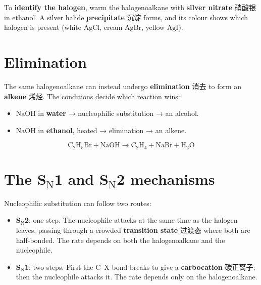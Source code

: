 \documentclass[11pt]{article}
\begin{document}
\begin{center}
\end{center}

To \textbf{identify the halogen}, warm the halogenoalkane with \textbf{silver nitrate} 硝酸银 in ethanol. A silver halide \textbf{precipitate} 沉淀 forms, and its colour shows which halogen is present (white $\text{AgCl}$, cream $\text{AgBr}$, yellow $\text{AgI}$).

\section*{Elimination}

The same halogenoalkane can instead undergo \textbf{elimination} 消去 to form an \textbf{alkene} 烯烃. The conditions decide which reaction wins:

\begin{itemize}
\item $\text{NaOH}$ in \textbf{water} → nucleophilic substitution → an alcohol.

\item $\text{NaOH}$ in \textbf{ethanol}, heated → elimination → an alkene.

\end{itemize}

\[
\text{C}_2\text{H}_5\text{Br} + \text{NaOH} \rightarrow \text{C}_2\text{H}_4 + \text{NaBr} + \text{H}_2\text{O}
\]

\section*{The S$_\text{N}$1 and S$_\text{N}$2 mechanisms}

Nucleophilic substitution can follow two routes:

\begin{itemize}
\item \textbf{S$_\text{N}$2}: one step. The nucleophile attacks at the same time as the halogen leaves, passing through a crowded \textbf{transition state} 过渡态 where both are half-bonded. The rate depends on both the halogenoalkane and the nucleophile.

\item \textbf{S$_\text{N}$1}: two steps. First the C–X bond breaks to give a \textbf{carbocation} 碳正离子; then the nucleophile attacks it. The rate depends only on the halogenoalkane.

\end{itemize}
\end{document}
